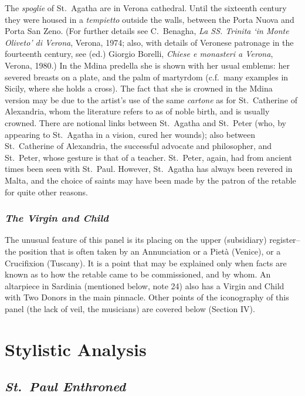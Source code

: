 \documentclass[a4paper,12pt]{article}
\begin{document}
The \textit{spoglie} of St.~Agatha are in Verona cathedral. Until the
sixteenth century they were housed in a \textit{tempietto} outside the
walls, between the Porta Nuova and Porta San Zeno.  (For further
details see C.~Benagha, \textit{La SS. Trinita `in Monte Oliveto' di
Verona}, Verona, 1974; also, with details of Veronese patronage in the
fourteenth century, see (ed.) Giorgio Borelli, \textit{Chiese e
monasteri a Verona}, Verona, 1980.)  In the Mdina predella she is
shown with her usual emblems: her severed breasts on a plate, and the
palm of martyrdom (c.f.~many examples in Sicily, where she holds a
cross). The fact that she is crowned in the Mdina version may be due
to the artist's use of the same \textit{cartone} as for St.~Catherine
of Alexandria, whom the literature refers to as of noble birth, and is
usually crowned. There are notional links between St.~Agatha and
St.~Peter (who, by appearing to St.~Agatha in a vision, cured her
wounds); also between St.~Catherine of Alexandria, the successful
advocate and philosopher, and St.~Peter, whose gesture is that of a
teacher. St.~Peter, again, had from ancient times been seen with
St.~Paul. However, St.~Agatha has always been revered in Malta, and
the choice of saints may have been made by the patron of the retable
for quite other reasons.

\subsubsection*{\textit{The Virgin and Child}}

The unusual feature of this panel is its placing on the upper
(subsidiary) register--the position that is often taken by an
Annunciation or a Piet\`a (Venice), or a Crucifixion (Tuscany).  It is a
point that may be explained only when facts are known as to how the
retable came to be commissioned, and by whom. An altarpiece in
Sardinia (mentioned below, note 24) also has a Virgin and Child with
Two Donors in the main pinnacle. Other points of the iconography of
this panel (the lack of veil, the musicians) are covered below
(Section IV).

\section{ Stylistic Analysis}

\subsection{\textit{St.~Paul Enthroned}}
\end{document}
